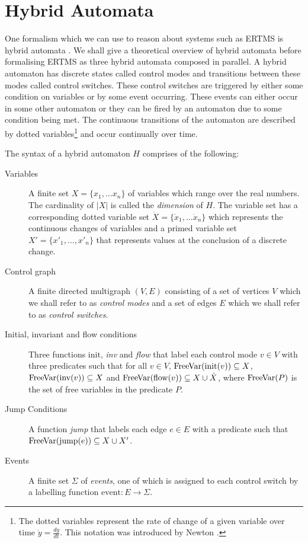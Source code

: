 \section{Hybrid Automata} \label{sec:hybrid}
One formalism which we can use to reason about systems such as ERTMS is hybrid automata \cite{TH96}. We shall give a theoretical overview of hybrid automata before formalising ERTMS as three hybrid automata composed in parallel. A hybrid automaton has discrete states called control modes and transitions between these modes called control switches. These control switches are triggered by either some condition on variables or by some event occurring. These events can either occur in some other automaton or they can be fired by an automaton due to some condition being met. The continuous transitions of the automaton are described by dotted variables\footnote{The dotted variables represent the rate of change of a given variable over time $\dot{y} = \frac{dy}{dt}$. This notation was introduced by Newton \cite{CF28}.} and occur continually over time.
\medskip
\begin{mydef}\label{def:hybridautomatonsyntax}
The syntax of a hybrid automaton $H$ comprises of the following:
\begin{description}
\item[Variables] A finite set $X = \{x_1, \ldots x_n \}$ of variables which range over the real numbers. The cardinality of $|X|$ is called the \emph{dimension} of $H$. The variable set has a corresponding dotted variable set $\dot{X} = \{\dot{x}_1, \ldots \dot{x}_n \}$ which represents the continuous changes of variables and a primed variable set $X' = \{x'_1, \ldots , x'_n \}$ that represents  values at the conclusion of a discrete change.

\item[Control graph] A finite directed multigraph $(V,E)$ consisting of a set of vertices $V$ which we shall refer to as \emph{control modes} and a set of edges $E$ which we shall refer to as \emph{control switches}.

\item[Initial, invariant and flow conditions] Three functions $\mathrm{init}$, \emph{inv} and \emph{flow} that label each control mode $v \in V$ with three predicates such that for all $v \in V$, $\mathrm{FreeVar}(\mathrm{init}(v)) \subseteq X$, $\mathrm{FreeVar}(\mathrm{inv}(v)) \subseteq X$ and $\mathrm{FreeVar}(\mathrm{flow}(v)) \subseteq X \cup \dot{X}$, where $\mathrm{FreeVar}(P)$ is the set of free variables in the predicate $P$.


\item[Jump Conditions] A function \emph{jump} that labels each edge $e \in E$ with a predicate such that $\mathrm{FreeVar}(\mathrm{jump}(e)) \subseteq X \cup X' $.

\item[Events] A finite set $\Sigma$ of \emph{events}, one of which is assigned to  each control switch by a labelling function $\mathrm{event}: E \to \Sigma$.

\end{description}

\end{mydef}
